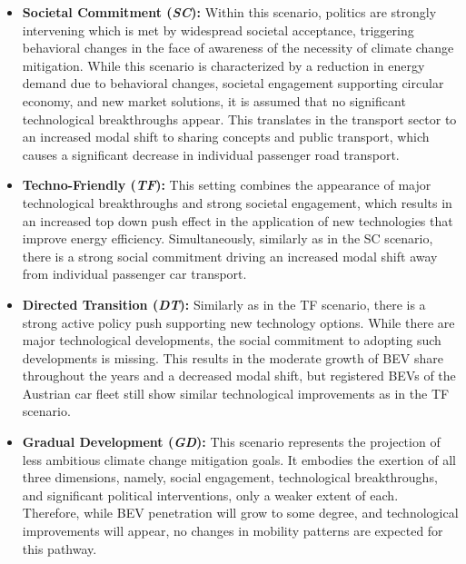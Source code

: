     \begin{itemize}
        \item \textbf{Societal Commitment (\textit{SC}):} Within this scenario, politics are strongly intervening  which is met by widespread societal acceptance, triggering behavioral changes in the face of awareness of the necessity of climate change mitigation. While this scenario is characterized by a reduction in energy demand due to behavioral changes, societal engagement supporting circular economy, and new market solutions, it is assumed that no significant technological breakthroughs appear. This translates in the transport sector to an increased modal shift to sharing concepts and public transport, which causes a significant decrease in individual passenger road transport.
        \item \textbf{Techno-Friendly (\textit{TF}):} This setting combines the appearance of major technological breakthroughs and strong societal engagement, which results in an increased top down push effect in the application of new technologies that improve energy efficiency. Simultaneously, similarly as in the SC scenario, there is a strong social commitment driving an increased modal shift away from individual passenger car transport. 
        \item \textbf{Directed Transition (\textit{DT}):} Similarly as in the TF scenario, there is a strong active policy push  supporting new technology options. While there are major technological developments, the social commitment to adopting such developments is missing. This results in the moderate growth of \ac{BEV} share throughout the years and a decreased modal shift, but registered \acp{BEV} of the Austrian car fleet still show similar technological improvements as in the TF scenario.
        \item \textbf{Gradual Development (\textit{GD}):} This scenario represents the projection of less ambitious climate change mitigation goals. It embodies the exertion of all three dimensions, namely, social engagement, technological breakthroughs, and significant political interventions, only a weaker extent of each. Therefore, while \ac{BEV} penetration will grow to some degree, and technological improvements will appear, no changes in mobility patterns are expected for this pathway.  
    \end{itemize}
    

